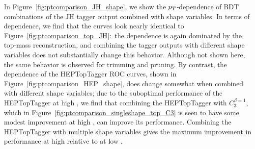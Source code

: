 In Figure~\ref{fig:ptcomparison_JH_shape}, we show the $p_T$-dependence of BDT combinations of the JH tagger output combined with shape variables. In terms of \pt dependence, we find that the curves look nearly identical to Figure~\ref{fig:ptcomparison_top_JH}:~the \pt dependence is again dominated by the top-mass reconstruction, and combining the tagger outputs with different shape variables does not substantially change this behavior. Although not shown here, the same behavior is observed for trimming and pruning. By contrast,  the \pt dependence of the HEPTopTagger ROC curves, shown in Figure~\ref{fig:ptcomparison_HEP_shape}, does change somewhat when combined with different shape variables; due to the suboptimal performance of the HEPTopTagger at high \pt, we find that combining the HEPTopTagger with $C_3^{\beta=1}$, which in Figure~\ref{fig:ptcomparison_singleshape_top_C3} is seen to have some modest improvement at high \pt, can improve its performance. Combining the HEPTopTagger with multiple shape variables gives the maximum improvement in performance at high \pt relative to at low \pt.\\

